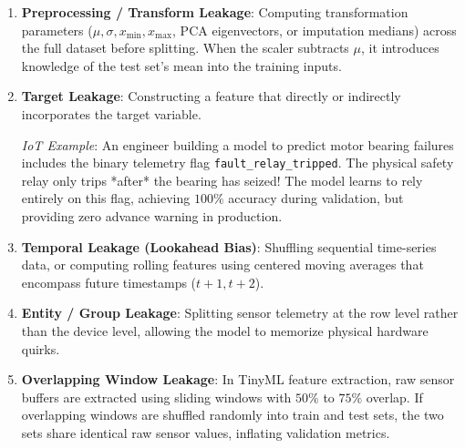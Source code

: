\begin{enumerate}
    \item \textbf{Preprocessing / Transform Leakage}: Computing transformation parameters ($\mu, \sigma, x_{\min}, x_{\max}$, PCA eigenvectors, or imputation medians) across the full dataset before splitting. When the scaler subtracts $\mu$, it introduces knowledge of the test set's mean into the training inputs.
    
    \item \textbf{Target Leakage}: Constructing a feature that directly or indirectly incorporates the target variable. 
    
    \textit{IoT Example}: An engineer building a model to predict motor bearing failures includes the binary telemetry flag \texttt{fault\_relay\_tripped}. The physical safety relay only trips *after* the bearing has seized! The model learns to rely entirely on this flag, achieving $100\%$ accuracy during validation, but providing zero advance warning in production.
    
    \item \textbf{Temporal Leakage (Lookahead Bias)}: Shuffling sequential time-series data, or computing rolling features using centered moving averages that encompass future timestamps ($t+1, t+2$).
    
    \item \textbf{Entity / Group Leakage}: Splitting sensor telemetry at the row level rather than the device level, allowing the model to memorize physical hardware quirks.
    
    \item \textbf{Overlapping Window Leakage}: In TinyML feature extraction, raw sensor buffers are extracted using sliding windows with $50\%$ to $75\%$ overlap. If overlapping windows are shuffled randomly into train and test sets, the two sets share identical raw sensor values, inflating validation metrics.
\end{enumerate}

